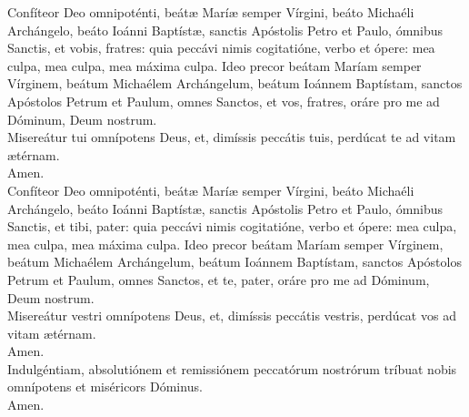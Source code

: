 \documentclass[twoside]{article}
\begin{document}
\begin{paracol}{2}
\vv Confíteor Deo omnipoténti, beátæ Maríæ semper Vírgini, beáto Michaéli Archángelo, beáto Ioánni Baptístæ, sanctis Apóstolis Petro et Paulo, ómnibus Sanctis, et vobis, fratres: quia peccávi nimis cogitatióne, verbo et ópere: mea culpa, mea culpa, mea máxima culpa. Ideo precor beátam Maríam semper Vírginem, beátum Michaélem Archángelum, beátum Ioánnem Baptístam, sanctos Apóstolos Petrum et Paulum, omnes Sanctos, et vos, fratres, oráre pro me ad Dóminum, Deum nostrum.\\
\rr Misereátur tui omnípotens Deus, et, dimíssis peccátis tuis, perdúcat te ad vitam ætérnam.\\
\vv Amen.\\
\rr Confíteor Deo omnipoténti, beátæ Maríæ semper Vírgini, beáto Michaéli Archángelo, beáto Ioánni Baptístæ, sanctis Apóstolis Petro et Paulo, ómnibus Sanctis, et tibi, pater: quia peccávi nimis cogitatióne, verbo et ópere: mea culpa, mea culpa, mea máxima culpa. Ideo precor beátam Maríam semper Vírginem, beátum Michaélem Archángelum, beátum Ioánnem Baptístam, sanctos Apóstolos Petrum et Paulum, omnes Sanctos, et te, pater, oráre pro me ad Dóminum, Deum nostrum.\\
\vv Misereátur vestri omnípotens Deus, et, dimíssis peccátis vestris, perdúcat vos ad vitam ætérnam.\\
\rr Amen.\\
\vv Indulgéntiam, \cc absolutiónem et remissiónem peccatórum nostrórum tríbuat nobis omnípotens et miséricors Dóminus.\\
\rr Amen.

\switchcolumn


\end{paracol}
\end{document}
